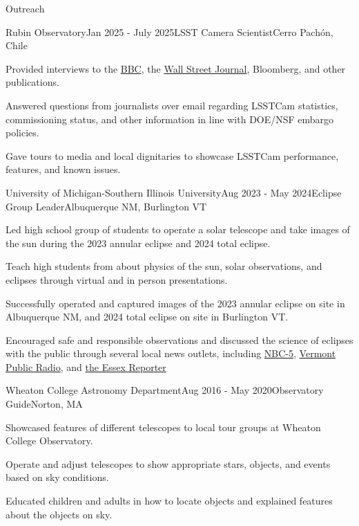 \documentclass{resume} %
\begin{document}
\begin{rSection}{Outreach}

\begin{rSubsection}{Rubin Observatory}{Jan 2025 - July 2025}{LSST Camera Scientist}{Cerro Pachón, Chile}
    \item Provided interviews to the \href{https://youtu.be/6RBZqhIgllI?si=WJu_PTFMFdWa_h7s}{BBC}, the \href{https://www.wsj.com/science/space-astronomy/worlds-largest-digital-camera-snaps-its-first-photos-of-the-universe-68099904?mod=Searchresults_pos1&page=1}{Wall Street Journal}, Bloomberg, and other publications.
    \item Answered questions from journalists over email regarding LSSTCam statistics, commissioning status, and other information in line with DOE/NSF embargo policies.
    \item Gave tours to media and local dignitaries to showcase LSSTCam performance, features, and known issues.
\end{rSubsection}

\begin{rSubsection}{University of Michigan-Southern Illinois University}{Aug 2023 - May 2024}{Eclipse Group Leader}{Albuquerque NM, Burlington VT}
    \item Led high school group of students to operate a solar telescope and take images of the sun during the 2023 annular eclipse and 2024 total eclipse.
    \item Teach high students from about physics of the sun, solar observations, and eclipses through virtual and in person presentations.
    \item Successfully operated and captured images of the 2023 annular eclipse on site in Albuquerque NM, and 2024 total eclipse on site in Burlington VT.
    \item Encouraged safe and responsible observations and discussed the science of eclipses with the public through several local news outlets, including \href{https://www.mynbc5.com/article/total-eclipse-nasa/60433342?utm_campaign=snd-autopilot}{NBC-5}, \href{https://www.vermontpublic.org/local-news/2024-04-10/nasa-volunteer-photo-eclipse-burlington-sun-atmosphere}{Vermont Public Radio}, and \href{https://www.essexreporter.com/news/physics-masters-student-collects-data-for-nasa-and-national-science-foundation-from-eclipse-in-burlington/article_1b7a72a8-76d5-52b7-8ffa-886491f640a4.html}{the Essex Reporter}
\end{rSubsection}



\begin{rSubsection}{Wheaton College Astronomy Department}{Aug 2016 - May 2020}{Observatory Guide}{Norton, MA}
    \item Showcased features of different telescopes to local tour groups at Wheaton College Observatory.
    \item Operate and adjust telescopes to show appropriate stars, objects, and events based on sky conditions.
    \item Educated children and adults in how to locate objects and explained features about the objects on sky.

\end{rSubsection}
\end{rSection}
\end{document}
